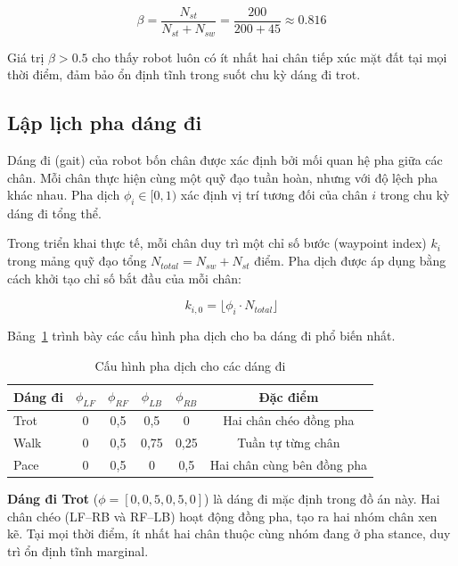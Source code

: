 \begin{equation}
\beta = \frac{N_{st}}{N_{st} + N_{sw}} = \frac{200}{200 + 45} \approx 0.816
\end{equation}

Giá trị $\beta > 0.5$ cho thấy robot luôn có ít nhất hai chân tiếp xúc mặt đất tại mọi thời điểm, đảm bảo ổn định tĩnh trong suốt chu kỳ dáng đi trot.

\subsection{Lập lịch pha dáng đi}

Dáng đi (gait) của robot bốn chân được xác định bởi mối quan hệ pha giữa các chân. Mỗi chân thực hiện cùng một quỹ đạo tuần hoàn, nhưng với độ lệch pha khác nhau. Pha dịch $\phi_i \in [0, 1)$ xác định vị trí tương đối của chân $i$ trong chu kỳ dáng đi tổng thể.

Trong triển khai thực tế, mỗi chân duy trì một chỉ số bước (waypoint index) $k_i$ trong mảng quỹ đạo tổng $N_{total} = N_{sw} + N_{st}$ điểm. Pha dịch được áp dụng bằng cách khởi tạo chỉ số bắt đầu của mỗi chân:

\begin{equation}
    k_{i,0} = \lfloor \phi_i \cdot N_{total} \rfloor
\end{equation}

Bảng~\ref{tab:gait_phases} trình bày các cấu hình pha dịch cho ba dáng đi phổ biến nhất.

\begin{table}[H]
\centering
\caption{Cấu hình pha dịch cho các dáng đi}
\label{tab:gait_phases}
\renewcommand{\arraystretch}{1.3}
\begin{tabular}{|l|c|c|c|c|c|}
\hline
\textbf{Dáng đi} & $\phi_{LF}$ & $\phi_{RF}$ & $\phi_{LB}$ & $\phi_{RB}$ & \textbf{Đặc điểm} \\ \hline
Trot & 0 & 0,5 & 0,5 & 0 & Hai chân chéo đồng pha \\ \hline
Walk & 0 & 0,5 & 0,75 & 0,25 & Tuần tự từng chân \\ \hline
Pace & 0 & 0,5 & 0 & 0,5 & Hai chân cùng bên đồng pha \\ \hline
\end{tabular}
\end{table}

\textbf{Dáng đi Trot} ($\phi = [0, 0{,}5, 0{,}5, 0]$) là dáng đi mặc định trong đồ án này. Hai chân chéo (LF--RB và RF--LB) hoạt động đồng pha, tạo ra hai nhóm chân xen kẽ. Tại mọi thời điểm, ít nhất hai chân thuộc cùng nhóm đang ở pha stance, duy trì ổn định tĩnh marginal.


